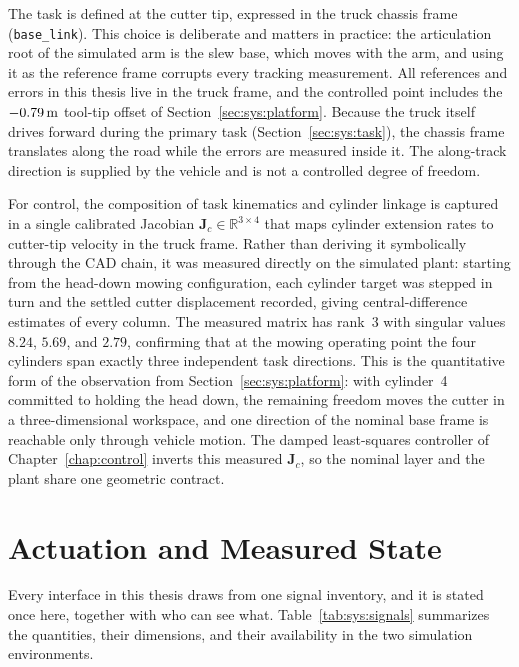 The task is defined at the cutter tip, expressed in the truck chassis
frame (\texttt{base\_link}). This choice is deliberate and matters in
practice: the articulation root of the simulated arm is the slew base,
which moves with the arm, and using it as the reference frame corrupts
every tracking measurement. All references and errors in this thesis
live in the truck frame, and the controlled point includes the
$\unit[-0.79]{m}$ tool-tip offset of Section~\ref{sec:sys:platform}.
Because the truck itself drives forward during the primary task
(Section~\ref{sec:sys:task}), the chassis frame translates along the
road while the errors are measured inside it. The along-track direction
is supplied by the vehicle and is not a controlled degree of freedom.

For control, the composition of task kinematics and cylinder linkage is
captured in a single calibrated Jacobian
$\bm{J}_c \in \mathbb{R}^{3\times4}$ that maps cylinder extension rates
to cutter-tip velocity in the truck frame. Rather than deriving it
symbolically through the CAD chain, it was measured directly on the
simulated plant: starting from the head-down mowing configuration, each
cylinder target was stepped in turn and the settled cutter displacement
recorded, giving central-difference estimates of every column. The
measured matrix has rank~3 with singular values $8.24$, $5.69$, and
$2.79$, confirming that at the mowing operating point the four
cylinders span exactly three independent task directions. This is the
quantitative form of the observation from
Section~\ref{sec:sys:platform}: with cylinder~4 committed to holding
the head down, the remaining freedom moves the cutter in a
three-dimensional workspace, and one direction of the nominal base
frame is reachable only through vehicle motion. The damped
least-squares controller of Chapter~\ref{chap:control} inverts this measured $\bm{J}_c$, so the nominal layer and the plant share one
geometric contract.

\section{Actuation and Measured State}
\label{sec:sys:actuation}

Every interface in this thesis draws from one signal inventory, and it is stated once here, together with who can see what.
Table~\ref{tab:sys:signals} summarizes the quantities, their
dimensions, and their availability in the two simulation environments.

